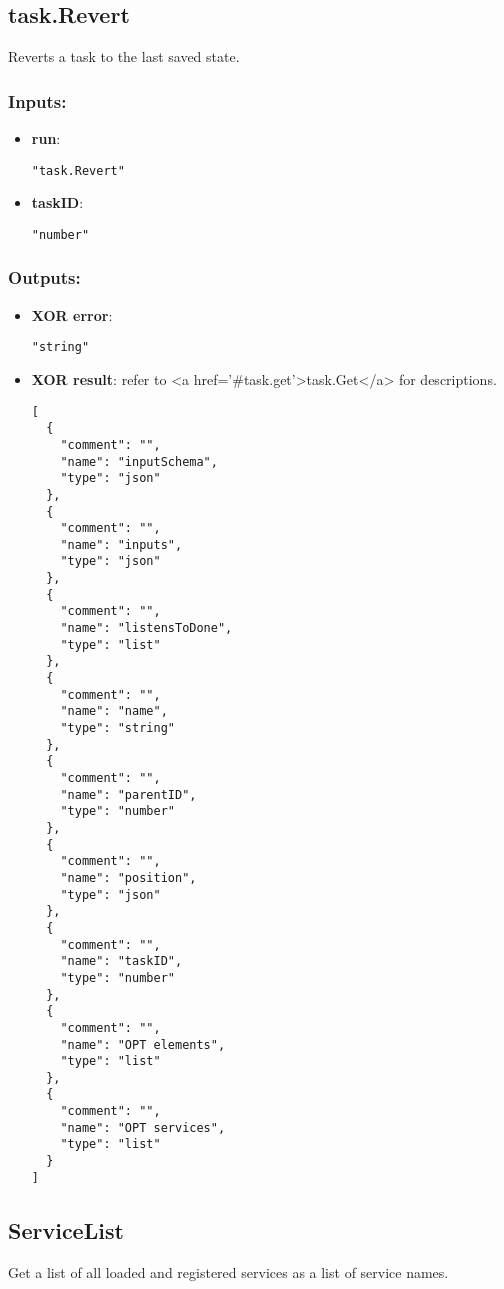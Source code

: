\subsection{task.Revert}
Reverts a task to the last saved state.
\subsubsection*{Inputs:}
\begin{itemize}
    \item \textbf{run}: 
\begin{lstlisting}
"task.Revert"
\end{lstlisting}
    \item \textbf{taskID}: 
\begin{lstlisting}
"number"
\end{lstlisting}
  \end{itemize}

\subsubsection*{Outputs:}
\begin{itemize}
    \item \textbf{XOR error}: 
\begin{lstlisting}
"string"
\end{lstlisting}
    \item \textbf{XOR result}: refer to <a href='\#task.get'>task.Get</a> for descriptions.
\begin{lstlisting}
[
  {
    "comment": "", 
    "name": "inputSchema", 
    "type": "json"
  }, 
  {
    "comment": "", 
    "name": "inputs", 
    "type": "json"
  }, 
  {
    "comment": "", 
    "name": "listensToDone", 
    "type": "list"
  }, 
  {
    "comment": "", 
    "name": "name", 
    "type": "string"
  }, 
  {
    "comment": "", 
    "name": "parentID", 
    "type": "number"
  }, 
  {
    "comment": "", 
    "name": "position", 
    "type": "json"
  }, 
  {
    "comment": "", 
    "name": "taskID", 
    "type": "number"
  }, 
  {
    "comment": "", 
    "name": "OPT elements", 
    "type": "list"
  }, 
  {
    "comment": "", 
    "name": "OPT services", 
    "type": "list"
  }
]
\end{lstlisting}
  \end{itemize}

\subsection{ServiceList}
Get a list of all loaded and registered services as a list of service names.
